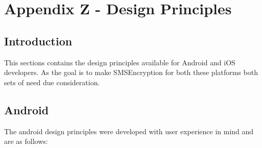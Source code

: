 \section{Appendix Z - Design Principles}

\subsection*{Introduction}
This sections contains the design principles available for Android and iOS developers. As the goal is to make SMSEncryption for both these platforms both sets of need due consideration.
\subsection*{Android}
The android design principles were developed with user experience in mind and are as follows:
